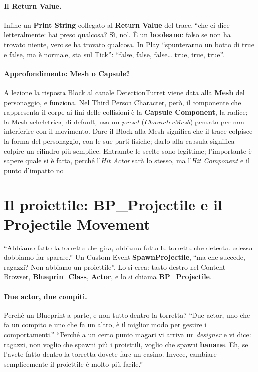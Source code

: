 \paragraph{Il Return Value.} Infine un \textbf{Print String} collegato al
\textbf{Return Value} del trace, ``che ci dice letteralmente: hai preso qualcosa? Sì,
no''. È un \textbf{booleano}: falso se non ha trovato niente, vero se ha trovato
qualcosa. In Play ``spunteranno un botto di true e false, ma è normale, sta sul Tick'':
``false, false, false\ldots{} true, true, true''.

\paragraph{Approfondimento: Mesh o Capsule?} A lezione la risposta Block al canale
DetectionTurret viene data alla \textbf{Mesh} del personaggio, e funziona. Nel Third
Person Character, però, il componente che rappresenta il corpo ai fini delle collisioni
è la \textbf{Capsule Component}, la radice; la Mesh scheletrica, di default, usa un
\emph{preset} (\emph{CharacterMesh}) pensato per non interferire con il movimento. Dare
il Block alla Mesh significa che il trace colpisce la forma del personaggio, con le sue
parti fisiche; darlo alla capsula significa colpire un cilindro più semplice. Entrambe
le scelte sono legittime; l'importante è sapere quale si è fatta, perché l'\emph{Hit
Actor} sarà lo stesso, ma l'\emph{Hit Component} e il punto d'impatto no.

\section{Il proiettile: BP\_Projectile e il Projectile Movement}
\label{ue5:sec:proiettile}

``Abbiamo fatto la torretta che gira, abbiamo fatto la torretta che detecta: adesso
dobbiamo far sparare.'' Un Custom Event \textbf{SpawnProjectile}, ``ma che succede,
ragazzi? Non abbiamo un proiettile''. Lo si crea: tasto destro nel Content Browser,
\textbf{Blueprint Class}, \textbf{Actor}, e lo si chiama \textbf{BP\_Projectile}.

\paragraph{Due actor, due compiti.} Perché un Blueprint a parte, e non tutto dentro la
torretta? ``Due actor, uno che fa un compito e uno che fa un altro, è il miglior modo
per gestire i comportamenti.'' ``Perché a un certo punto magari vi arriva un
\emph{designer} e vi dice: ragazzi, non voglio che spawni più i proiettili, voglio che
spawni \textbf{banane}. Eh, se l'avete fatto dentro la torretta dovete fare un casino.
Invece, cambiare semplicemente il proiettile è molto più facile.''

